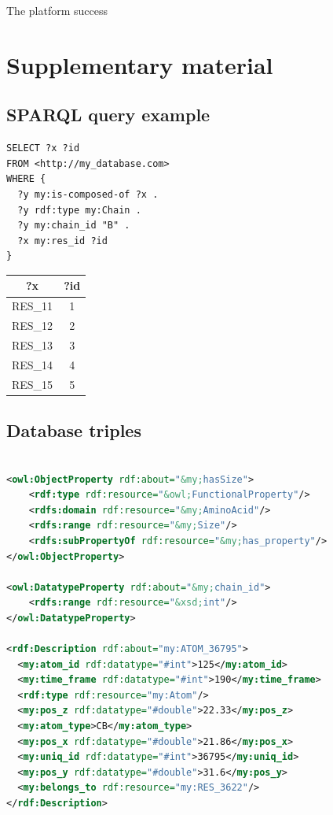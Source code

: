 \documentclass{vgtc}                          %
\begin{document}
The platform success






\section{Supplementary material}

\subsection{SPARQL query example}

\begin{lstlisting}[language=SPARQL]
SELECT ?x ?id
FROM <http://my_database.com> 
WHERE {
  ?y my:is-composed-of ?x .
  ?y rdf:type my:Chain .
  ?y my:chain_id "B" .
  ?x my:res_id ?id
}
\end{lstlisting}
\noindent

\begin{center}
 \begin{tabular}{|c | c|} 
 \hline
 ?x & ?id \\ [0.5ex] 
 \hline
 RES\_11 & 1 \\ 
 RES\_12 & 2 \\
 RES\_13 & 3 \\
 RES\_14 & 4 \\
 RES\_15 & 5 \\
 \hline
\end{tabular}
\end{center}
\noindent

\subsection{Database triples}

\begin{lstlisting}[language=XML]

<owl:ObjectProperty rdf:about="&my;hasSize">
    <rdf:type rdf:resource="&owl;FunctionalProperty"/>
    <rdfs:domain rdf:resource="&my;AminoAcid"/>
    <rdfs:range rdf:resource="&my;Size"/>
    <rdfs:subPropertyOf rdf:resource="&my;has_property"/>
</owl:ObjectProperty>

<owl:DatatypeProperty rdf:about="&my;chain_id">
    <rdfs:range rdf:resource="&xsd;int"/>
</owl:DatatypeProperty>

<rdf:Description rdf:about="my:ATOM_36795">
  <my:atom_id rdf:datatype="#int">125</my:atom_id>
  <my:time_frame rdf:datatype="#int">190</my:time_frame>
  <rdf:type rdf:resource="my:Atom"/>
  <my:pos_z rdf:datatype="#double">22.33</my:pos_z>
  <my:atom_type>CB</my:atom_type>
  <my:pos_x rdf:datatype="#double">21.86</my:pos_x>
  <my:uniq_id rdf:datatype="#int">36795</my:uniq_id>
  <my:pos_y rdf:datatype="#double">31.6</my:pos_y>
  <my:belongs_to rdf:resource="my:RES_3622"/>
</rdf:Description>

\end{lstlisting}
\end{document}

